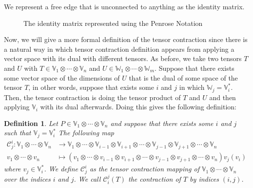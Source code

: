 \documentclass[11pt,a4paper,openright,oneside]{book}
\numberwithin{equation}{section}
\newtheorem{defn0}{Definition}[chapter]
\newenvironment{definition}{ \begin{defn0}}{\end{defn0}}
\begin{document}
We represent a free edge that is unconnected to anything as the identity matrix.
\begin{figure}
    \centering

    \caption{
        The identity matrix represented using the Penrose Notation
    }
\end{figure}

Now, we will give a more formal definition of the tensor contraction since there is a natural way in which tensor contraction definition
appears from applying a vector space with its dual with different tensors. As before, we take two tensors $T$ and $U$ with
$T \in \mathbb{V}_1 \otimes \cdots \otimes \mathbb{V}_n$ and $U \in \mathbb{W}_1 \otimes \cdots \otimes \mathbb{W}_m$. Suppose that there exists
some vector space of the dimensions of $U$ that is the dual of some space of the tensor $T$, in other words, suppose that exists
some $i$ and $j$ in which $\mathbb{W}_j = \mathbb{V}_i^*$. Then, the tensor contraction is doing the tensor product of $T$ and $U$ and then applying
$\mathbb{V}_i$ with its dual afterwards. Doing this gives the following definition:

\begin{definition}
    Let $P \in \mathbb{V}_1 \otimes \cdots \otimes \mathbb{V}_n$
    and suppose that there exists some $i$ and $j$ such
    that $\mathbb{V}_j = \mathbb{V}_i^*$ The following map
    $$
    \begin{align}
    \mathcal{C}_j^i: 
    \mathbb{V}_1 \otimes \cdots \otimes \mathbb{V}_n &\longrightarrow 
    \mathbb{V}_1 \otimes \cdots \otimes \mathbb{V}_{i-1} \otimes \mathbb{V}_{i+1} \otimes \cdots \otimes \mathbb{V}_{j-1} \otimes \mathbb{V}_{j+1} \otimes \cdots \otimes \mathbb{V}_n \\
 v_1 \otimes \cdots \otimes v_n
                                                     &\longmapsto \left( v_1 \otimes \cdots \otimes v_{i-1} \otimes v_{i+1} \otimes \cdots \otimes v_{j-1} \otimes v_{j+1} \otimes \cdots \otimes v_n \right) v_j(v_i)
\end{align}
$$
where $v_j \in \mathbb{V}_i^*$. We define 
$\mathcal{C}_j^i$ as the tensor contraction mapping of $\mathbb{V}_1 \otimes \cdots \otimes \mathbb{V}_n$ over the indices $i$ and $j$.
We call $\mathcal{C}_i^j(T)$ the contraction of $T$ by indices $(i,j)$.
\label{def:contraction}
\end{definition}
\end{document}

